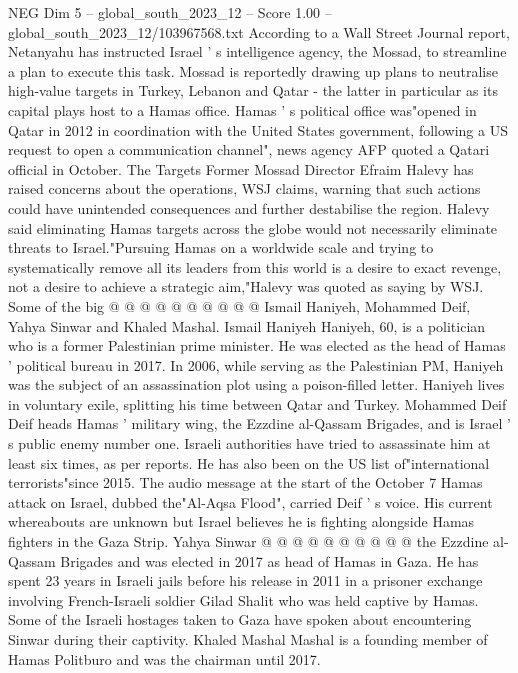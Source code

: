 \begin{textsample}{NEG Dim 5 – global\_south\_2023\_12 – Score 1.00 – global\_south\_2023\_12/103967568.txt}  \label{ex:f5_neg_358}
According to a Wall Street Journal report, Netanyahu has instructed Israel ' s intelligence agency, the Mossad, to streamline a plan to execute this task.
Mossad is reportedly drawing up plans to neutralise high-value targets in Turkey, Lebanon and Qatar - the latter in particular as its capital plays host to a Hamas office.
Hamas ' s political office was"opened in Qatar in 2012 in coordination with the United States government, following a US request to open a communication channel", news agency AFP quoted a Qatari official in October.
The Targets Former Mossad Director Efraim Halevy has raised concerns about the operations, WSJ claims, warning that such actions could have unintended consequences and further destabilise the region.
Halevy said eliminating Hamas targets across the globe would not necessarily eliminate threats to Israel."Pursuing Hamas on a worldwide scale and trying to systematically remove all its leaders from this world is a desire to exact revenge, not a desire to achieve a strategic aim,"Halevy was quoted as saying by WSJ.
Some of the big @ @ @ @ @ @ @ @ @ @ Ismail Haniyeh, Mohammed Deif, Yahya Sinwar and Khaled Mashal.
Ismail Haniyeh Haniyeh, 60, is a politician who is a former Palestinian prime minister.
He was elected as the head of Hamas ' political bureau in 2017.
In 2006, while serving as the Palestinian PM, Haniyeh was the subject of an assassination plot using a poison-filled letter.
Haniyeh lives in voluntary exile, splitting his time between Qatar and Turkey.
Mohammed Deif Deif heads Hamas ' military wing, the Ezzdine al-Qassam Brigades, and is Israel ' s public enemy number one.
Israeli authorities have tried to assassinate him at least six times, as per reports.
He has also been on the US list of"international terrorists"since 2015.
The audio message at the start of the October 7 Hamas attack on Israel, dubbed the"Al-Aqsa Flood", carried Deif ' s voice.
His current whereabouts are unknown but Israel believes he is fighting alongside Hamas fighters in the Gaza Strip.
Yahya Sinwar @ @ @ @ @ @ @ @ @ @ the Ezzdine al-Qassam Brigades and was elected in 2017 as head of Hamas in Gaza.
He has spent 23 years in Israeli jails before his release in 2011 in a prisoner exchange involving French-Israeli soldier Gilad Shalit who was held captive by Hamas.
Some of the Israeli hostages taken to Gaza have spoken about encountering Sinwar during their captivity.
Khaled Mashal Mashal is a founding member of Hamas Politburo and was the chairman until 2017.

\end{textsample}
